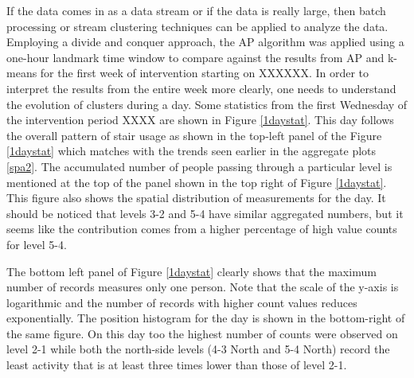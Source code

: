     
If the data comes in as a data stream or if the data is really large, then batch processing or stream clustering techniques can be applied to analyze the data. Employing a divide and conquer approach, the AP algorithm was applied using a one-hour landmark time window to compare against the results from AP and k-means for the first week of intervention starting on XXXXXX. In order to interpret the results from the entire week more clearly, one needs to understand the evolution of clusters during a day. Some statistics from the first Wednesday of the intervention period XXXX are shown in Figure \ref{1daystat}. This day follows the overall pattern of stair usage as shown in the top-left panel of the Figure \ref{1daystat} which matches with the trends seen earlier in the aggregate plots \ref{spa2}. The accumulated number of people passing through a particular level is mentioned at the top of the panel shown in the top right of Figure \ref{1daystat}. This figure also shows the spatial distribution of measurements for the day. It should be noticed that levels 3-2 and 5-4 have similar aggregated numbers, but it seems like the contribution comes from a higher percentage of high value counts for level 5-4.

The bottom left panel of Figure \ref{1daystat} clearly shows that the maximum number of records measures only one person. Note that the scale of the y-axis is logarithmic and the number of records with higher count values reduces exponentially. The position histogram for the day is shown in the bottom-right of the same figure. On this day too the highest number of counts were observed on level 2-1 while both the north-side levels (4-3 North and 5-4 North) record the least activity that is at least three times lower than those of level 2-1. 

